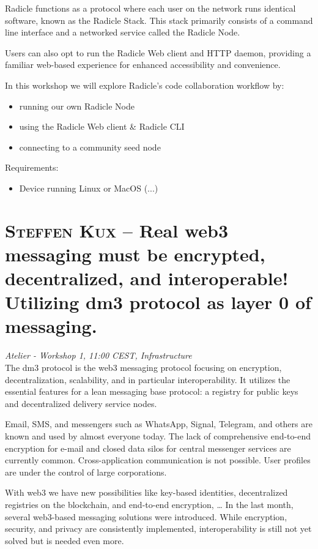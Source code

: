 Radicle functions as a protocol where each user on the network runs identical software, known as the Radicle Stack. This stack primarily consists of a command line interface and a networked service called the Radicle Node.

Users can also opt to run the Radicle Web client and HTTP daemon, providing a familiar web-based experience for enhanced accessibility and convenience.

In this workshop we will explore Radicle's code collaboration workflow by:
\begin{itemize}
\item running our own Radicle Node
\item using the Radicle Web client \& Radicle CLI
\item connecting to a community seed node
\end{itemize}

\noindent Requirements:
\begin{itemize}
\item Device running Linux or MacOS (...)
\end{itemize}
\clearpage
\section {\textsc{Steffen Kux} -- Real web3 messaging must be encrypted, decentralized, and interoperable! Utilizing dm3 protocol as layer 0 of messaging.
} \noindent \textit {Atelier - Workshop 1, 11:00 CEST, Infrastructure
}\\[1em] The dm3 protocol is the web3 messaging protocol focusing on encryption, decentralization, scalability, and in particular interoperability. It utilizes the essential features for a lean messaging base protocol: a registry for public keys and decentralized delivery service nodes.
\par Email, SMS, and messengers such as WhatsApp, Signal, Telegram, and others are known and used by almost everyone today. The lack of comprehensive end-to-end encryption for e-mail and closed data silos for central messenger services are currently common. Cross-application communication is not possible. User profiles are under the control of large corporations.

With web3 we have new possibilities like key-based identities, decentralized registries on the blockchain, and end-to-end encryption, \ldots
{} In the last month, several web3-based messaging solutions were introduced. While encryption, security, and privacy are consistently implemented, interoperability is still not yet solved but is needed even more.

